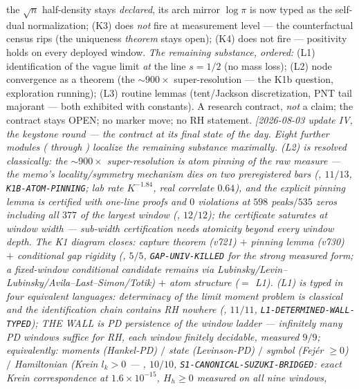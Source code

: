 \documentclass[11pt,a4paper]{article}
\begin{document}
the $\sqrt{n}$ half-density stays \emph{declared}, its arch mirror
$\log\pi$ is now typed as the self-dual normalization; (K3) does
\emph{not} fire at measurement level --- the counterfactual census
rips (the uniqueness \emph{theorem} stays open); (K4) does not fire
--- positivity holds on every deployed window.  \emph{The remaining
substance, ordered:} (L1) identification of the vague limit
\emph{at} the line $s=1/2$ (no mass loss); (L2) node convergence as
a theorem (the ${\sim}900\times$ super-resolution --- the K1b
question, exploration running); (L3) routine lemmas (tent/Jackson
discretization, PNT tail majorant --- both exhibited with
constants).  A research contract, \emph{not} a claim; the contract
stays OPEN; no marker move; no RH statement.
\emph{[2026-08-03 update IV, the keystone round --- the contract at
its final state of the day.  Eight further modules
( through
) localize the remaining substance
maximally.  \emph{(L2) is resolved classically:} the
${\sim}900\times$ super-resolution is \emph{atom pinning} of the
raw measure --- the memo's locality/symmetry mechanism dies on two
preregistered bars (, $11/13$,
\texttt{K1B-ATOM-PINNING}; lab rate $K^{-1.84}$, real correlate
$0.64$), and the explicit pinning lemma is certified with one-line
proofs and $0$ violations at $598$ peaks$/535$ zeros including all
$377$ of the largest window
(, $12/12$); the certificate
saturates at window width --- sub-width certification needs
atomicity beyond every window depth.  The K1 diagram closes:
capture theorem (v721) $+$ pinning lemma (v730) $+$ conditional gap
rigidity (, $5/5$,
\texttt{GAP-UNIV-KILLED} for the strong measured form; a
fixed-window conditional candidate remains via
Lubinsky/Levin--Lubinsky/Avila--Last--Simon/Totik) $+$ atom
structure ($=$ L1).  \emph{(L1) is typed in four equivalent
languages:} determinacy of the limit moment problem is
\emph{classical} and the identification chain contains RH nowhere
(, $11/11$,
\texttt{L1-DETERMINED-WALL-TYPED}); THE WALL is \emph{PD
persistence of the window ladder} --- infinitely many PD windows
suffice for RH, each window finitely decidable, measured $9/9$;
equivalently: moments (Hankel-PD) $/$ state (Levinson-PD) $/$
symbol (Fej\'er $\ge0$) $/$ Hamiltonian (Krein $l_k>0$ ---
, $10/10$,
\texttt{S1-CANONICAL-SUZUKI-BRIDGED}: exact Krein correspondence at
$1.6\times10^{-15}$, $H_h\ge0$ measured on all nine windows,
}
\end{document}
